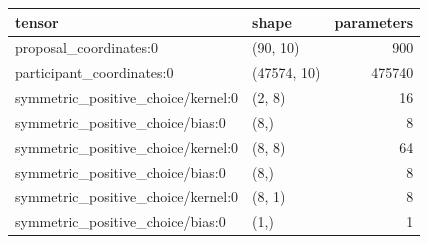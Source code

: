 \begin{tabular}{llr}
\toprule
tensor & shape & parameters \\
\midrule
proposal_coordinates:0 & (90, 10) & 900 \\
participant_coordinates:0 & (47574, 10) & 475740 \\
symmetric_positive_choice/kernel:0 & (2, 8) & 16 \\
symmetric_positive_choice/bias:0 & (8,) & 8 \\
symmetric_positive_choice/kernel:0 & (8, 8) & 64 \\
symmetric_positive_choice/bias:0 & (8,) & 8 \\
symmetric_positive_choice/kernel:0 & (8, 1) & 8 \\
symmetric_positive_choice/bias:0 & (1,) & 1 \\
\bottomrule
\end{tabular}
